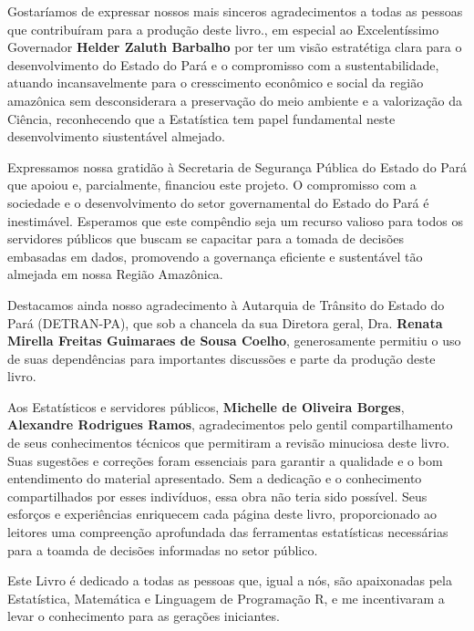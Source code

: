 \begin{refsection}


Gostaríamos de expressar nossos mais sinceros agradecimentos a todas as pessoas que contribuíram para a produção deste livro., em especial ao Excelentíssimo Governador \textbf{Helder Zaluth Barbalho} por ter um visão estratétiga clara para o desenvolvimento do Estado do Pará e o compromisso com a sustentabilidade, atuando incansavelmente para o cresscimento econômico e social da região amazônica sem desconsiderara a preservação do meio ambiente e a valorização da Ciência, reconhecendo que a Estatística tem papel fundamental neste desenvolvimento siustentável almejado.\vst

Expressamos nossa gratidão à Secretaria de Segurança Pública do Estado do Pará que apoiou e, parcialmente, financiou este projeto. O compromisso com a sociedade e o desenvolvimento do setor governamental do Estado do Pará é inestimável. Esperamos que este compêndio seja um recurso valioso para todos os servidores públicos que buscam se capacitar para a tomada de decisões embasadas em dados, promovendo a governança eficiente e sustentável tão almejada em nossa Região Amazônica.\vst

Destacamos ainda nosso agradecimento à Autarquia de Trânsito do Estado do Pará (DETRAN-PA), que sob a chancela da sua Diretora geral, Dra. \textbf{Renata Mirella Freitas Guimaraes de Sousa Coelho}, generosamente permitiu o uso de suas dependências para importantes discussões e parte da produção deste livro.
\vst

Aos Estatísticos e servidores públicos, \textbf{Michelle de Oliveira Borges}, \textbf{Alexandre Rodrigues Ramos}, agradecimentos pelo gentil compartilhamento de seus conhecimentos técnicos que permitiram a revisão minuciosa deste livro. Suas sugestões e correções foram essenciais para garantir a qualidade e o bom entendimento do material apresentado. Sem a dedicação e o conhecimento compartilhados por esses indivíduos, essa obra não teria sido possível. Seus esforços e experiências enriquecem cada página deste livro, proporcionado ao leitores uma compreenção aprofundada das ferramentas estatísticas necessárias para a toamda de decisões informadas no setor público.

\newpage

Este Livro é dedicado a todas as pessoas que, igual a nós, são apaixonadas pela Estatística, Matemática e Linguagem de Programação R, e me incentivaram a levar o conhecimento para as gerações iniciantes.
\vst







\printbibliography[heading=subbibliography]
\end{refsection}






